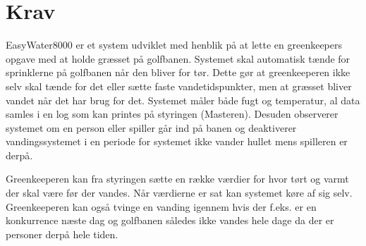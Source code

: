 \chapter{Krav}
EasyWater8000 er et system udviklet med henblik på at lette en greenkeepers opgave med at holde græsset på golfbanen. 	Systemet skal automatisk tænde for sprinklerne på golfbanen når den bliver for tør. Dette gør at greenkeeperen ikke selv skal tænde for det eller sætte faste vandetidspunkter, men at græsset bliver vandet når det har brug for det. Systemet måler både fugt og temperatur, al data samles i en log som kan printes på styringen (Masteren).  Desuden observerer systemet om en person eller spiller går ind på banen og deaktiverer vandingssystemet i en periode for systemet ikke vander hullet mens spilleren er derpå. 

Greenkeeperen kan fra styringen sætte en række værdier for hvor tørt og varmt der skal være før der vandes. Når værdierne er sat kan systemet køre af sig selv. Greenkeeperen kan også tvinge en vanding igennem hvis der f.eks. er en konkurrence næste dag og golfbanen således ikke vandes hele dage da der er personer derpå hele tiden. 